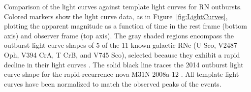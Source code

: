 \label{fig:RecurrentNovaLightCurveComparison}
Comparison of the \spock light curves against template light curves
for RN outbursts.  Colored markers show the \spock light curve data,
as in Figure~\ref{fig:LightCurves}, plotting the apparent magnitude as
a function of time in the rest frame (bottom axis) and observer frame
(top axis). The gray shaded regions encompass the outburst light curve
shapes of 5 of the 11 known galactic RNe (U Sco, V2487 Oph, V394 CrA,
T CrB, and V745 Sco), selected because they exhibit a rapid decline in
their light curves \citep{Schaefer:2010}.  The solid black line traces
the 2014 outburst light curve shape for the rapid-recurrence nova M31N
2008a-12 \citep{Darnley:2014}.  All template light curves have been
normalized to match the observed peaks of the \spock events.

  
